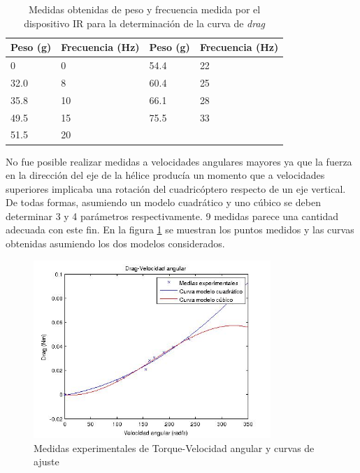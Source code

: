 \documentclass[spanish,12pt,a4paper,titlepage]{report}
\begin{document}
\begin{table}[H]
\centering
\begin{tabular}{|p{80pt}|p{80pt}||p{80pt}|p{80pt}|} 
 \cellcolor[gray]{0.8} \textbf{Peso (g)} & \cellcolor[gray]{0.8} \textbf{Frecuencia (Hz)} & \cellcolor[gray]{0.8} \textbf{Peso (g)} & \cellcolor[gray]{0.8} \textbf{Frecuencia (Hz)}\\ \hline
 
 0  & 0     & 54.4 & 22\\ \hline

32.0 & 8   &  60.4  & 25  \\ \hline

 35.8  & 10   & 66.1 & 28\\ \hline

49.5 & 15 & 75.5 & 33  \\ \hline
51.5 & 20 & & \\ \hline

\end{tabular}
\caption{Medidas obtenidas de peso y frecuencia medida por el dispositivo IR para la determinación de la curva de \emph{drag}}
\label{tab:torque-vel}
\end{table}


No fue posible realizar medidas a velocidades angulares mayores ya que la fuerza en la dirección del eje de la hélice producía un momento que a velocidades superiores implicaba una rotación del cuadricóptero respecto de un eje vertical. De todas formas, asumiendo un modelo cuadrático y uno cúbico se deben determinar 3 y 4 parámetros respectivamente. 9 medidas parece una cantidad adecuada con este fin. En la figura \ref{fig:grafica3} se muestran los puntos medidos y las curvas obtenidas asumiendo los dos modelos considerados.


\begin{figure}
  \vspace{-20pt}
  \begin{center}
    \includegraphics[width=0.8\textwidth]{./Pics/grafica3.jpg}
  \end{center}
  \vspace{-20pt}
  \caption{Medidas experimentales de Torque-Velocidad angular y curvas de ajuste}
  \label{fig:grafica3}
  \vspace{-10pt}
\end{figure}
\end{document}
